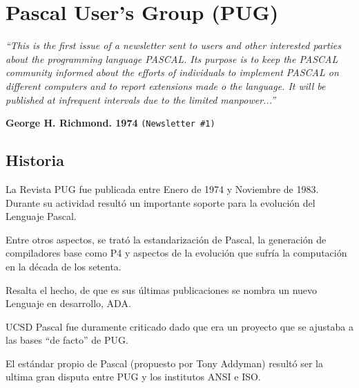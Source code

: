 
\label{chap:cap5}

\section{Pascal User's Group (PUG)}

\begin{flushleft}
\textit{``This is the first issue of a newsletter sent to users and other 
interested parties about the programming language PASCAL.
Its purpose is to keep the PASCAL community informed about the efforts of 
individuals to implement PASCAL on different computers and to report extensions 
made o the language.
It will be published at infrequent intervals due to the limited manpower...''} 
\end{flushleft}
\begin{flushleft}
\textbf{George H. Richmond. 1974} \texttt{(Newsletter \#1)}
\end{flushleft}

\subsection{Historia}

La Revista PUG fue publicada entre Enero de 1974 y Noviembre de 1983. Durante su 
actividad resultó un importante soporte para la evolución del Lenguaje Pascal.


Entre otros aspectos, se trató la estandarización de Pascal, la generación de 
compiladores base como P4 y aspectos de la evolución que sufría la computación 
en la década de los setenta.


Resalta el hecho, de que es sus últimas publicaciones se nombra un nuevo 
Lenguaje en desarrollo, ADA.


UCSD Pascal fue duramente criticado dado que era un proyecto que se ajustaba a 
las bases ``de facto'' de PUG.


El estándar propio de Pascal (propuesto por Tony Addyman) resultó ser la ultima 
gran disputa entre PUG y los institutos ANSI e ISO.


